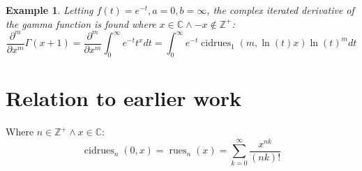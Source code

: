 \documentclass[]{article}
\DeclareMathOperator{\rues}{rues}
\DeclareMathOperator{\cidrues}{cidrues}
\newcommand{\pqty}[1]{{\left(#1\right)}}
\newcommand{\pdiff}[2]{\frac{\partial^{#2}}{\partial #1^{#2}}}
\newtheorem{example}{Example}[section]
\numberwithin{equation}{section}
\begin{document}
	\begin{example}
		Letting $f\pqty{t}=e^{-t},a=0,b=\infty$, the complex iterated derivative of the gamma function is found where $x\in\mathbb{C}\land -x\not\in\mathbb{Z}^+$:
		\begin{equation}
			\pdiff{x}{m}\Gamma\pqty{x+1} =
			\pdiff{x}{m}\int_{0}^{\infty}e^{-t}t^x dt =
			\int_{0}^{\infty}e^{-t}\cidrues_1\pqty{m,\ln\pqty{t}x}\ln\pqty{t}^m dt
		\end{equation}
	\end{example}
	
	\section{Relation to earlier work}
	Where \(n\in\mathbb{Z}^+\land x\in\mathbb{C}\):
	\begin{equation}
	\cidrues_n\pqty{0,x}=
	\rues_n\pqty{x}=
	\sum_{k=0}^{\infty}\frac{x^{nk}}{\pqty{nk}!}
	\end{equation}
\end{document}
